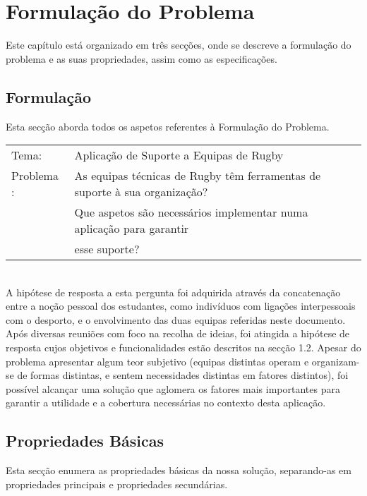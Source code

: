 %
%
%
\chapter{Formulação do Problema} \label{cap:formulacao}

Este capítulo está organizado em três secções, onde se descreve a formulação do problema e as suas propriedades, assim como as especificações.\\

\section{Formulação}\label{sec21}
Esta secção aborda todos os aspetos referentes à Formulação do Problema.\\

\begin{tabular}{ll}
	Tema: & Aplicação de Suporte a Equipas de Rugby \\
	Problema : & As equipas técnicas de Rugby têm ferramentas de suporte à sua organização? \\
		&	Que aspetos são necessários implementar numa aplicação para garantir \\
		&	esse suporte?\\
\end{tabular}\\[10mm]
A hipótese de resposta a esta pergunta foi adquirida através da concatenação entre a noção pessoal dos estudantes, como indivíduos com ligações interpessoais com o desporto, e o envolvimento das duas equipas referidas neste documento. Após diversas reuniões com foco na recolha de ideias, foi atingida a hipótese de resposta cujos objetivos e funcionalidades estão descritos na secção 1.2. Apesar do problema apresentar algum teor subjetivo (equipas distintas operam e organizam-se de formas distintas, e sentem necessidades distintas em fatores distintos), foi possível alcançar uma solução que aglomera os fatores mais importantes para garantir a utilidade e a cobertura necessárias no contexto desta aplicação.

\section{Propriedades Básicas}\label{sec22}
Esta secção enumera as propriedades básicas da nossa solução, separando-as em propriedades principais e propriedades secundárias.

